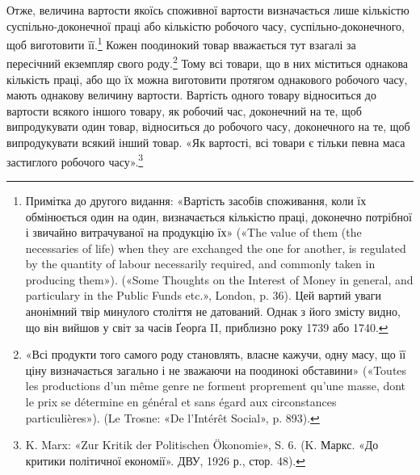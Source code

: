 Отже, величина вартости якоїсь споживної вартости визначається
лише кількістю суспільно-доконечної праці або кількістю
робочого часу, суспільно-доконечного, щоб виготовити
її.\footnote{
Примітка до другого видання: «Вартість засобів споживання, коли
їх обмінюється один на один, визначається кількістю праці, доконечно потрібної
і звичайно витрачуваної на продукцію їх» («The value of them
(the necessaries of life) when they are exchanged the one for another, is
regulated by the quantity of labour necessarily required, and commonly
taken in producing them»). («Some Thoughts on the Interest of Money in
general, and particulary in the Public Funds etc.», London, p. 36). Цей
вартий уваги анонімний твір минулого століття не датований. Однак
з його змісту видно, що він вийшов у світ за часів Ґеорґа II, приблизно
року 1739 або 1740.
} Кожен поодинокий товар вважається тут взагалі за пересічний
екземпляр свого роду.\footnote{
«Всі продукти того самого роду становлять, власне кажучи, одну
масу, що її ціну визначається загально і не зважаючи на поодинокі обставини»
(«Toutes les productions d’un même genre ne forment proprement
qu’une masse, dont le prix se détermine en général et sans égard aux circonstances
particulières»). (Le Trosne: «De l’Intérêt Social», p. 893).
} Тому всі товари, що в них міститься
однакова кількість праці, або що їх можна виготовити протягом
однакового робочого часу, мають однакову величину вартости.
Вартість одного товару відноситься до вартости всякого іншого
товару, як робочий час, доконечний на те, щоб випродукувати
один товар, відноситься до робочого часу, доконечного на те,
щоб випродукувати всякий інший товар. «Як вартості, всі товари
є тільки певна маса застиглого робочого часу».\footnote{
K. Marx: «Zur Kritik der Politischen Ökonomie», S. 6. (K. Маркс.
«До критики політичної економії». ДВУ, 1926 р., стор. 48).
}
